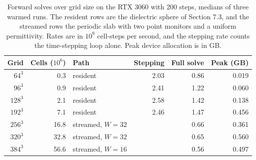 \begin{table}[tbp]
\centering
\small
\renewcommand{\arraystretch}{1.15}
\caption{Forward solves over grid size on the RTX 3060 with 200 steps, medians of three warmed runs. The resident rows are the dielectric sphere of Section 7.3, and the streamed rows the periodic slab with two point monitors and a uniform permittivity. Rates are in $10^9$ cell-steps per second, and the stepping rate counts the time-stepping loop alone. Peak device allocation is in GB.}
\label{tab:si-scaling-forward}
\begin{tabular}{@{}rrlrrr@{}}
\toprule
Grid & Cells ($10^6$) & Path & Stepping & Full solve & Peak (GB) \\
\midrule
$64^3$ & 0.3 & resident & 2.03 & 0.86 & 0.019 \\
$96^3$ & 0.9 & resident & 2.41 & 1.22 & 0.060 \\
$128^3$ & 2.1 & resident & 2.58 & 1.42 & 0.138 \\
$192^3$ & 7.1 & resident & 2.46 & 1.47 & 0.456 \\
$256^3$ & 16.8 & streamed, $W=32$ &  & 0.66 & 0.361 \\
$320^3$ & 32.8 & streamed, $W=32$ &  & 0.65 & 0.560 \\
$384^3$ & 56.6 & streamed, $W=16$ &  & 0.56 & 0.497 \\
\bottomrule
\end{tabular}
\end{table}
